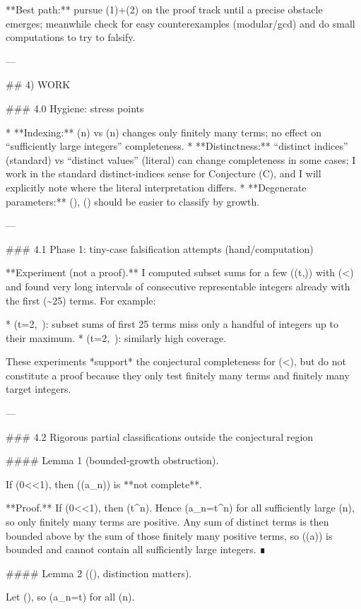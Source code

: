**Best path:** pursue (1)+(2) on the proof track until a precise obstacle emerges; meanwhile check for easy counterexamples (modular/gcd) and do small computations to try to falsify.

---

## 4) WORK

### 4.0 Hygiene: stress points

* **Indexing:** (n) vs (n) changes only finitely many terms; no effect on “sufficiently large integers” completeness.
* **Distinctness:** “distinct indices” (standard) vs “distinct values” (literal) can change completeness in some cases; I work in the standard distinct-indices sense for Conjecture (C), and I will explicitly note where the literal interpretation differs.
* **Degenerate parameters:** (\alpha{}), (\alpha{}) should be easier to classify by growth.

---

### 4.1 Phase 1: tiny-case falsification attempts (hand/computation)

**Experiment (not a proof).** I computed subset sums for a few ((t,\alpha)) with (\alpha<\varphi) and found very long intervals of consecutive representable integers already with the first (\sim 25) terms. For example:

* (t=2,\ ): subset sums of first 25 terms miss only a handful of integers up to their maximum.
* (t=2,\ ): similarly high coverage.

These experiments *support* the conjectural completeness for (\alpha<\varphi), but do not constitute a proof because they only test finitely many terms and finitely many target integers.

---

### 4.2 Rigorous partial classifications outside the conjectural region

#### Lemma 1 (bounded-growth obstruction).

If (0<\alpha<1), then ((a_n)) is **not complete**.

**Proof.**
If (0<\alpha<1), then (t\alpha^n). Hence (a_n=\lfloor t\alpha^n) for all sufficiently large (n), so only finitely many terms are positive. Any sum of distinct terms is then bounded above by the sum of those finitely many positive terms, so (\Sigma(a)) is bounded and cannot contain all sufficiently large integers. ∎

#### Lemma 2 ((), distinction matters).

Let (), so (a_n=\lfloor t\rfloor) for all (n).

